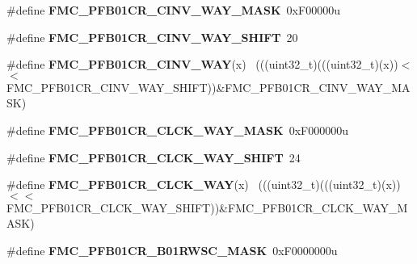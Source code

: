 \begin{DoxyCompactItemize}
\item 
\hypertarget{group___f_m_c___register___masks_ga6f57990417c03669247374790d246d37}{}\#define {\bfseries F\+M\+C\+\_\+\+P\+F\+B01\+C\+R\+\_\+\+C\+I\+N\+V\+\_\+\+W\+A\+Y\+\_\+\+M\+A\+S\+K}~0x\+F00000u\label{group___f_m_c___register___masks_ga6f57990417c03669247374790d246d37}

\item 
\hypertarget{group___f_m_c___register___masks_gab04c9e3f4a55f62c5ceef96ee7d13175}{}\#define {\bfseries F\+M\+C\+\_\+\+P\+F\+B01\+C\+R\+\_\+\+C\+I\+N\+V\+\_\+\+W\+A\+Y\+\_\+\+S\+H\+I\+F\+T}~20\label{group___f_m_c___register___masks_gab04c9e3f4a55f62c5ceef96ee7d13175}

\item 
\hypertarget{group___f_m_c___register___masks_gaa20dfbf1f98927e81c33cd0abf6aac04}{}\#define {\bfseries F\+M\+C\+\_\+\+P\+F\+B01\+C\+R\+\_\+\+C\+I\+N\+V\+\_\+\+W\+A\+Y}(x)                                ~(((uint32\+\_\+t)(((uint32\+\_\+t)(x))$<$$<$F\+M\+C\+\_\+\+P\+F\+B01\+C\+R\+\_\+\+C\+I\+N\+V\+\_\+\+W\+A\+Y\+\_\+\+S\+H\+I\+F\+T))\&F\+M\+C\+\_\+\+P\+F\+B01\+C\+R\+\_\+\+C\+I\+N\+V\+\_\+\+W\+A\+Y\+\_\+\+M\+A\+S\+K)\label{group___f_m_c___register___masks_gaa20dfbf1f98927e81c33cd0abf6aac04}

\item 
\hypertarget{group___f_m_c___register___masks_gac97f4d3b4de87684266ebcf771bdff64}{}\#define {\bfseries F\+M\+C\+\_\+\+P\+F\+B01\+C\+R\+\_\+\+C\+L\+C\+K\+\_\+\+W\+A\+Y\+\_\+\+M\+A\+S\+K}~0x\+F000000u\label{group___f_m_c___register___masks_gac97f4d3b4de87684266ebcf771bdff64}

\item 
\hypertarget{group___f_m_c___register___masks_ga466d70d7c5ac71e66a9e09e6541c8a32}{}\#define {\bfseries F\+M\+C\+\_\+\+P\+F\+B01\+C\+R\+\_\+\+C\+L\+C\+K\+\_\+\+W\+A\+Y\+\_\+\+S\+H\+I\+F\+T}~24\label{group___f_m_c___register___masks_ga466d70d7c5ac71e66a9e09e6541c8a32}

\item 
\hypertarget{group___f_m_c___register___masks_ga1a96049d6bac6ce048d65c5f2b40ed09}{}\#define {\bfseries F\+M\+C\+\_\+\+P\+F\+B01\+C\+R\+\_\+\+C\+L\+C\+K\+\_\+\+W\+A\+Y}(x)                                ~(((uint32\+\_\+t)(((uint32\+\_\+t)(x))$<$$<$F\+M\+C\+\_\+\+P\+F\+B01\+C\+R\+\_\+\+C\+L\+C\+K\+\_\+\+W\+A\+Y\+\_\+\+S\+H\+I\+F\+T))\&F\+M\+C\+\_\+\+P\+F\+B01\+C\+R\+\_\+\+C\+L\+C\+K\+\_\+\+W\+A\+Y\+\_\+\+M\+A\+S\+K)\label{group___f_m_c___register___masks_ga1a96049d6bac6ce048d65c5f2b40ed09}

\item 
\hypertarget{group___f_m_c___register___masks_gaa63494a4a6deae3c23e885c034b23400}{}\#define {\bfseries F\+M\+C\+\_\+\+P\+F\+B01\+C\+R\+\_\+\+B01\+R\+W\+S\+C\+\_\+\+M\+A\+S\+K}~0x\+F0000000u\label{group___f_m_c___register___masks_gaa63494a4a6deae3c23e885c034b23400}


\end{DoxyCompactItemize}
